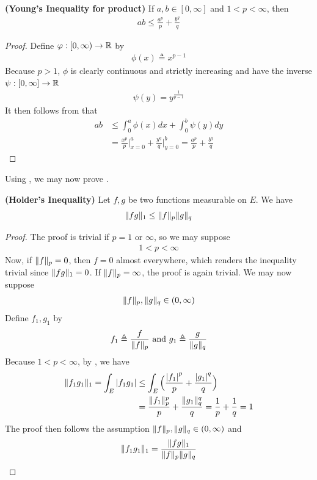 \documentclass{report}
\begin{document}
\begin{theorem}
\label{YIfp}
\textbf{(Young's Inequality for product)} If $a,b \in [0,\infty]$ and $1< p < \infty$, then 
\begin{align*}
  ab \leq  \frac{a^p}{p} + \frac{b^q}{q}
\end{align*}
\end{theorem}
\begin{proof}
Define $\varphi :[0,\infty)\rightarrow \mathbb{R}$ by 
\begin{align*}
\phi (x)\triangleq x^{p-1}
\end{align*}
Because $p>1$, $\phi$ is clearly continuous and strictly increasing and have the inverse $\psi : [0,\infty]\rightarrow \mathbb{R}$ 
\begin{align*}
\psi (y)=  y^{ \frac{1}{p-1}}
\end{align*}
It then follows from  that 
\begin{align*}
  ab &\leq \int_0^a \phi (x)dx+ \int_0^b \psi (y)dy \\
  &= \frac{x^p}{p}\Big|_{x=0}^a + \frac{y ^q}{q}\Big|_{y=0}^b = \frac{a^p}{p} + \frac{b^q}{q}
\end{align*}
\end{proof}
\begin{mdframed}
Using , we may now prove . 
\end{mdframed}
\begin{theorem}
\label{HI}
\textbf{(Holder's Inequality)} Let $f,g$ be two functions measurable on $E$. We have 
 \begin{align*}
\| fg \|_1 \leq \| f \|_p \| g \|_q
\end{align*}
\end{theorem}
\begin{proof}
The proof is trivial if $p=1\text{ or }\infty$, so we may suppose
\begin{align*}
1< p <\infty
\end{align*}
Now, if $\| f \|_p=0$, then $f=0$ almost everywhere, which renders the inequality trivial since $\| fg \|_1=0$. If $\| f \|_p=\infty$, the proof is again trivial. We may now suppose  
\begin{align*}
\| f \|_p , \| g \|_q \in (0,\infty)
\end{align*}
Define $f_1,g_1$ by 
\begin{align*}
f_1 \triangleq \frac{f}{\| f \|_p} \text{ and }g_1 \triangleq \frac{g}{\| g \|_q}
\end{align*}
Because $1<p<\infty$, by  , we have
\begin{align*}
  \| f_1g_1 \|_1=\int_E \left|f_1g_1\right| &\leq \int_E \Big( \frac{\left|f_1\right|^p}{p}+ \frac{\left|g_1\right|^q}{q} \Big) \\
&= \frac{\| f_1 \|_p^p}{p} + \frac{\| g_1 \|_q^q}{q}= \frac{1}{p}+ \frac{1}{q}=1
\end{align*}
The proof then follows the assumption $\| f \|_p,\| g \|_q \in (0,\infty)$ and  
\begin{align*}
\| f_1g_1 \|_1= \frac{\| fg \|_1}{\| f \|_p \| g \|_q}
\end{align*}
\end{proof}
\end{document}

